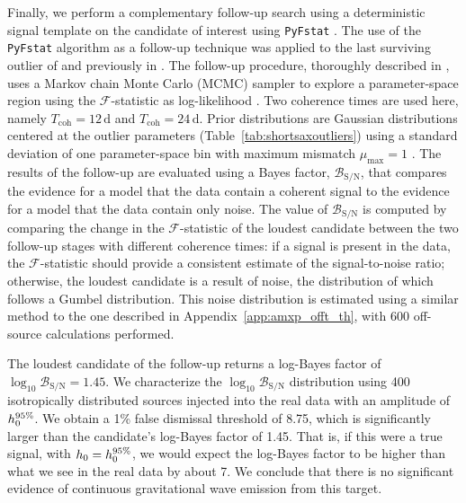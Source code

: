\begin{subappendices}
Finally, we perform a complementary follow-up search using a deterministic signal template on the candidate of interest using \texttt{PyFstat} \cite{Ashton:2018ure, Keitel:2021xeq}. The use of the \texttt{PyFstat} algorithm as a follow-up technique was applied to the last surviving outlier of \citet{o3aAllSkyIso} and previously in \citet{Covas:2020nwy, o3abinaryallsky}.
The follow-up procedure, thoroughly described in \citet{Tenorio:2021njf}, uses a Markov chain Monte Carlo (MCMC) sampler \cite{emcee, ptemcee} to explore a parameter-space region using the $\mathcal{F}$-statistic 
as log-likelihood \cite{JKS98}. Two coherence times are used here, namely $T_{\textrm{coh}} = 12\,\textrm{d}$ and $T_{\textrm{coh}} = 24\,\textrm{d}$. Prior distributions 
are Gaussian distributions centered at the outlier parameters (Table~\ref{tab:shortsaxoutliers}) using a standard deviation of one parameter-space bin with maximum mismatch $\mu_{\textrm{max}}=1$ \cite{Leaci2015}. 
The results of the follow-up are evaluated using a Bayes factor, $\mathcal{B}_{\textrm{S}/\textrm{N}}$, that compares the evidence for a model that the data contain a coherent signal to the 
evidence for a model that the data contain only noise.
The value of $\mathcal{B}_{\textrm{S}/\textrm{N}}$ is computed by comparing the change in the $\mathcal{F}$-statistic of the 
loudest candidate between the two follow-up stages with different coherence times: if a signal is present in the data, the $\mathcal{F}$-statistic should provide a consistent estimate of the  
signal-to-noise ratio; otherwise, the loudest candidate is a result of noise, the distribution of which follows a Gumbel distribution. This noise distribution is estimated using a similar method to the one described in Appendix~\ref{app:amxp_offt_th}, with 600 off-source calculations performed. 

The loudest candidate of the follow-up returns a log-Bayes factor of 
$\log_{10}\mathcal{B}_{\textrm{S}/\textrm{N}} = 1.45$. We characterize the 
$\log_{10}\mathcal{B}_{\textrm{S}/\textrm{N}}$ distribution using 400 isotropically distributed sources
injected into the real data with an amplitude of $h_0^{95\%}$. We obtain a 1\% false dismissal threshold of 8.75, 
which is significantly larger than the candidate's log-Bayes factor of 1.45. That is, if this were a true signal, 
with $h_0 = h_0^{95\%}$, we would expect the log-Bayes factor to be higher than what we see in the real data by about 7.
We conclude that there is no significant evidence of continuous gravitational wave emission from this target.


% 



\end{subappendices}
